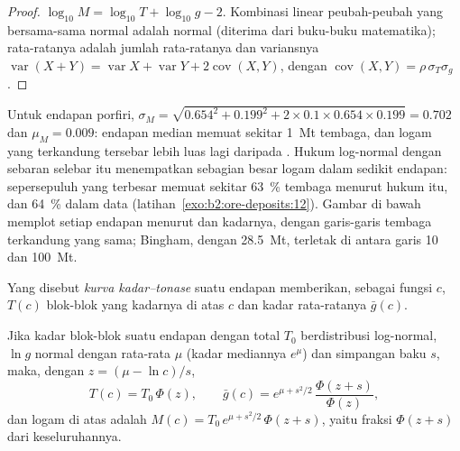 \begin{proof}
$\log_{10} M = \log_{10} T + \log_{10} g - 2$. Kombinasi linear peubah-peubah yang bersama-sama normal adalah
normal (diterima dari buku-buku matematika); rata-ratanya adalah jumlah rata-ratanya dan variansnya
$\operatorname{var}(X + Y) = \operatorname{var} X + \operatorname{var} Y + 2\operatorname{cov}(X, Y)$,
dengan $\operatorname{cov}(X, Y) = \rho\,\sigma_T\sigma_g$.
\end{proof}

Untuk endapan porfiri, $\sigma_M = \sqrt{0.654^2 + 0.199^2 + 2 \times 0.1 \times 0.654 \times
0.199} = 0.702$ dan $\mu_M = 0.009$: endapan median memuat sekitar \qty{1}{Mt} tembaga, dan
logam yang terkandung tersebar lebih luas lagi daripada . Hukum log-normal dengan sebaran selebar itu
menempatkan sebagian besar logam dalam sedikit endapan: sepersepuluh yang terbesar memuat sekitar \qty{63}{\percent}
tembaga menurut hukum itu, dan \qty{64}{\percent} dalam data (latihan~\ref{exo:b2:ore-deposits:12}). Gambar
di bawah memplot setiap endapan menurut  dan kadarnya, dengan garis-garis tembaga terkandung yang sama;
Bingham, dengan \qty{28.5}{Mt}, terletak di antara garis 10 dan \qty{100}{Mt}.

\begin{definition}\label{def:b2:ore-deposits:gt}
Yang disebut \emph{kurva kadar--tonase} suatu endapan memberikan, sebagai fungsi
 $c$,  $T(c)$ blok-blok yang kadarnya di atas $c$ dan kadar rata-ratanya
$\bar g(c)$.
\end{definition}

\begin{proposition}\label{prop:b2:ore-deposits:gt}
Jika kadar blok-blok suatu endapan dengan  total $T_0$ berdistribusi log-normal, $\ln g$ normal
dengan rata-rata $\mu$ (kadar mediannya $e^{\mu}$) dan simpangan baku $s$, maka, dengan $z = (\mu -
\ln c)/s$,
\begin{equation}
T(c) = T_0\,\Phi(z), \qquad
\bar g(c) = e^{\mu + s^2/2}\,\frac{\Phi(z + s)}{\Phi(z)} ,
\label{eq:b2:ore-deposits:gt}
\end{equation}
dan logam di atas  adalah $M(c) = T_0\,e^{\mu + s^2/2}\,\Phi(z + s)$, yaitu fraksi $\Phi(z +
s)$ dari keseluruhannya.
\end{proposition}

